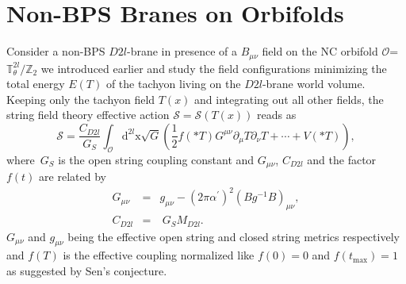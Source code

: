 \documentclass[a4paper,12pt]{article}
\begin{document}
\section{Non-BPS Branes on Orbifolds}

Consider a non-BPS $D2l$-brane in presence of a $B_{\mu \nu }$
field on the NC orbifold
$\mathcal{O}$=$\mathbb{T}^{2l}_{\theta}/\mathbb{Z}_{2}$ we
introduced earlier and study the field configurations minimizing
the total energy $E(T)$ of the tachyon living on the $D2l$-brane
world volume. Keeping only the tachyon field $T(x)$ and
integrating out all other fields, the string field theory
effective action $\mathcal{S}=\mathcal{S}(T(x))$ reads as
\begin{equation}\label{sftaction}
\mathcal{S}=\frac{C_{D2l}}{G_{S}}\int_{\mathcal{O}}\text{d}^{2l}\text{x}%
\sqrt{G}\left( \frac{1}{2}f\left( \ast T\right) G^{\mu \nu }\partial _{\mu
}T\partial _{\nu }T+\cdots +V\left( \ast T\right) \right) ,
\end{equation}
where\ $G_{S}$ is the open string coupling constant and $G_{\mu \nu }$, $%
C_{D2l}$ and the factor $f\left( t\right) $ are related by
\begin{eqnarray}
G_{\mu \nu } &=&g_{\mu \nu }-\left( 2\pi \alpha ^{\prime }\right) ^{2}\left(
Bg^{-1}B\right) _{\mu \nu }, \\
C_{D2l} &=&\ G_{S}M_{D2l}.
\end{eqnarray}
$G_{\mu \nu }$ and $g_{\mu \nu }$ being the effective open string
and closed string metrics respectively and $f(T)$ is the effective
coupling normalized like $f(0)=0$ and $f(t_{\text{max}})=1$ as
suggested by Sen's conjecture.
\end{document}
